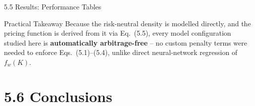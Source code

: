 \documentclass[aspectratio=169,10pt]{beamer}
\begin{document}
\begin{frame}[allowframebreaks]{5.5 Results: Performance Tables}
\begin{block}{Practical Takeaway}
Because the risk-neutral density is modelled directly, and the pricing
function is derived from it via Eq.~(5.5), every model configuration
studied here is \textbf{automatically arbitrage-free} -- no custom
penalty terms were needed to enforce Eqs.~(5.1)--(5.4), unlike direct
neural-network regression of $f_w(K)$.
\end{block}

\end{frame}

\section{5.6 Conclusions}
\end{document}

